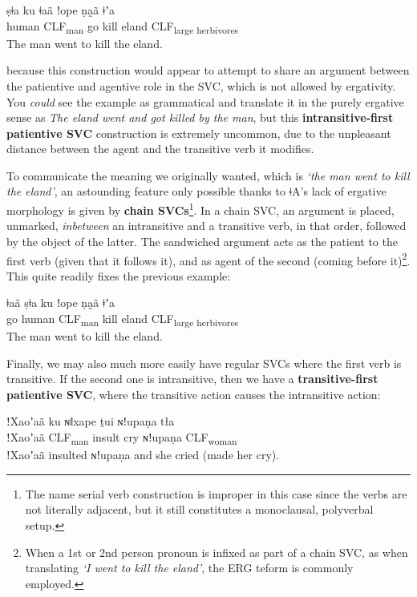 \documentclass[11pt,a5paper]{book}
\newcommand{\qcn}[1]{\textcolor{AccentText}{\large#1}}
\newcommand{\langname}{\qcn{ǂA}}
\newcommand{\transl}[2]{\qcn{#1} \emph{#2}}
\newcommand{\grammsc}[1]{\textsc{#1}}
\newcommand{\CLF}[1]{\grammsc{CLF}\textsubscript{#1}}
\newcommand{\ERG}{\grammsc{ERG}}
\begin{document}
\begin{exe}
\ex
\gll *ṣǂa ku ǂaã ǃope ṇa̰ã ǂʼa \\
human \CLF{man} go kill eland \CLF{large herbivores}\\
\glt *The man went to kill the eland.
\end{exe}

because this construction would appear to attempt to share an argument between the patientive and agentive role in the SVC, which is not allowed by ergativity. You \emph{could} see the example as grammatical and translate it in the purely ergative sense as \transl{}{The eland went and got killed by the man}, but this \textbf{intransitive-first patientive SVC} construction is extremely uncommon, due to the unpleasant distance between the agent and the transitive verb it modifies. 

To communicate the meaning we originally wanted, which is \emph{`the man went to kill the eland'}, an astounding feature only possible thanks to \langname{}'s lack of ergative morphology is given by \textbf{chain SVCs}\footnote{The name serial verb construction is improper in this case since the verbs are not literally adjacent, but it still constitutes a monoclausal, polyverbal setup.}. In a chain SVC, an argument is placed, unmarked, \emph{inbetween} an intransitive and a transitive verb, in that order, followed by the object of the latter. The sandwiched argument acts as the patient to the first verb (given that it follows it), and as agent of the second (coming before it)\footnote{When a 1st or 2nd person pronoun is infixed as part of a chain SVC, as when translating \emph{`I went to kill the eland'}, the \ERG{} teform is commonly employed.}. This quite readily fixes the previous example:

\begin{exe}
\ex
\gll ǂaã ṣǂa ku  ǃope ṇa̰ã ǂʼa \\
go human \CLF{man} kill eland \CLF{large herbivores}\\
\glt The man went to kill the eland.
\end{exe}

Finally, we may also much more easily have regular SVCs where the first verb is transitive. If the second one is intransitive, then we have a \textbf{transitive-first patientive SVC}, where the transitive action causes the intransitive action:

\begin{exe}
\ex
\gll ǃXaoʼaã ku ɴǁxape ṯui ɴǃupaṇa  tła\\
ǃXaoʼaã \CLF{man} insult cry ɴǃupaṇa \CLF{woman}\\
\glt ǃXaoʼaã insulted ɴǃupaṇa and she cried (made her cry).
\end{exe}
\end{document}
